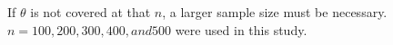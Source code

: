 \documentclass[12pt, letterpaper, titlepage]{article}
\begin{document}
If $\theta$ is not covered at that $n$, a larger sample size must be necessary. $n = 100, 200, 300, 400, and 500$ were used in this study. 




\end{document}
